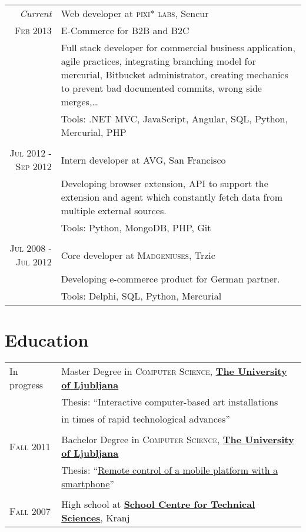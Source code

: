 \documentclass[a4paper,10pt]{article} %
\begin{document}
\begin{tabular}{r|p{10cm}}
\emph{Current} & Web developer at \textsc{pixi* labs}, Sencur \\
\textsc{Feb 2013} & E-Commerce for B2B and B2C\\
& \footnotesize{Full stack developer for commercial business application, agile practices, integrating branching model for mercurial, Bitbucket administrator, creating mechanics to prevent bad documented commits, wrong side merges,\dots} \\
& \footnotesize{Tools: .NET MVC, JavaScript, Angular, SQL, Python, Mercurial, PHP} \\
\multicolumn{2}{c}{} \\

\textsc{Jul 2012 - Sep 2012} & Intern developer at \textsc{AVG}, San Francisco \emph{}\\
& \footnotesize{Developing browser extension, API to support the extension and agent which constantly fetch data from multiple external sources.} \\
& \footnotesize{Tools: Python, MongoDB, PHP, Git} \\ 
\multicolumn{2}{c}{} \\

\textsc{Jul 2008 - Jul 2012} & Core developer at \textsc{Madgeniuses}, Trzic \emph{}\\
& \footnotesize{Developing e-commerce product for German partner.}\\
& \footnotesize{Tools: Delphi, SQL, Python, Mercurial}\\
\end{tabular}


\section{Education}

\begin{tabular}{p{2cm}l}	
\hfill In progress & Master Degree in \textsc{Computer Science}, \href{www.fri.uni-lj.si}{\textbf{The University of Ljubljana}} \\
& Thesis: ``Interactive computer-based art installations\\ & \hphantom{Thesis: ``}in times of rapid technological advances'' \\
\\

\hfill \textsc{Fall} 2011 & Bachelor Degree in \textsc{Computer Science}, \href{www.fri.uni-lj.si}{\textbf{The University of Ljubljana}} \\
& Thesis: ``\href{https://github.com/majcn/roomba}{Remote control of a mobile platform with a smartphone}'' \\
\\

\hfill \textsc{Fall} 2007 & High school at \href{http://www.sckr.si/}{\textbf{School Centre for Technical Sciences}}, Kranj\\
\end{tabular}
\end{document}
